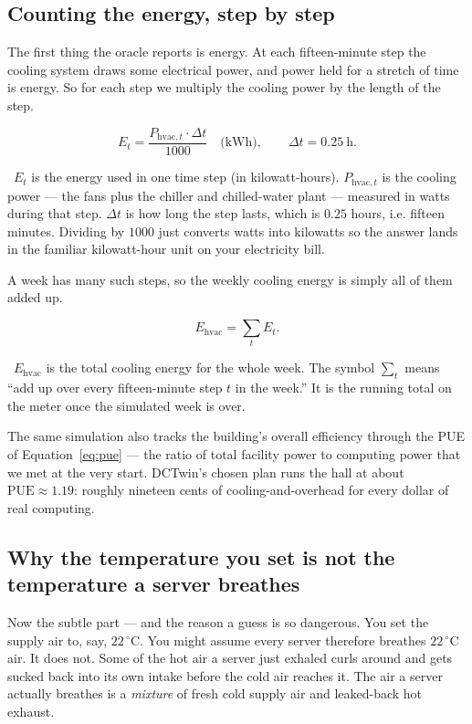 \documentclass[11pt]{report}
\newcommand{\plainwords}[1]{\par\smallskip\noindent{\itshape In plain words.}~#1\par\smallskip}
\begin{document}
\subsection*{Counting the energy, step by step}

The first thing the oracle reports is energy. At each fifteen-minute step the cooling system draws some electrical power, and power held for a stretch of time is energy. So for each step we multiply the cooling power by the length of the step.

\begin{equation}\label{eq:energy-step}
E_t = \frac{P_{\text{hvac},t} \cdot \Delta t}{1000} \quad \text{(kWh)}, \qquad \Delta t = 0.25\ \text{h}.
\end{equation}
\plainwords{$E_t$ is the energy used in one time step (in kilowatt-hours). $P_{\text{hvac},t}$ is the cooling power --- the fans plus the chiller and chilled-water plant --- measured in watts during that step. $\Delta t$ is how long the step lasts, which is $0.25$ hours, i.e. fifteen minutes. Dividing by $1000$ just converts watts into kilowatts so the answer lands in the familiar kilowatt-hour unit on your electricity bill.}

A week has many such steps, so the weekly cooling energy is simply all of them added up.

\begin{equation}\label{eq:energy-week}
E_{\text{hvac}} = \sum_{t} E_t.
\end{equation}
\plainwords{$E_{\text{hvac}}$ is the total cooling energy for the whole week. The symbol $\sum_t$ means ``add up over every fifteen-minute step $t$ in the week.'' It is the running total on the meter once the simulated week is over.}

The same simulation also tracks the building's overall efficiency through the PUE of Equation~\ref{eq:pue} --- the ratio of total facility power to computing power that we met at the very start. DCTwin's chosen plan runs the hall at about $\mathrm{PUE} \approx 1.19$: roughly nineteen cents of cooling-and-overhead for every dollar of real computing.

\subsection*{Why the temperature you set is not the temperature a server breathes}

Now the subtle part --- and the reason a guess is so dangerous. You set the supply air to, say, $22\,^\circ$C. You might assume every server therefore breathes $22\,^\circ$C air. It does not. Some of the hot air a server just exhaled curls around and gets sucked back into its own intake before the cold air reaches it. The air a server actually breathes is a \emph{mixture} of fresh cold supply air and leaked-back hot exhaust.
\end{document}
